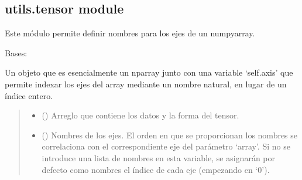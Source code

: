 \documentclass[letterpaper,10pt,english]{sphinxmanual}
\begin{document}
\sphinxstepscope


\subsection{utils.tensor module}
\label{\detokenize{utils.tensor:module-utils.tensor}}\label{\detokenize{utils.tensor:utils-tensor-module}}\label{\detokenize{utils.tensor::doc}}
\sphinxAtStartPar
Este módulo permite definir nombres para los ejes
de un numpyarray.

\begin{fulllineitems}
\label{\detokenize{utils.tensor:utils.tensor.Tensor}}
\pysigstartsignatures
{}
\pysigstopsignatures
\sphinxAtStartPar
Bases: 

\sphinxAtStartPar
Un objeto que es esencialmente un nparray junto con una variable ‘self.axis’ que permite indexar los ejes del array mediante un nombre natural, en lugar de un índice entero.
\begin{quote}\begin{description}
\begin{itemize}
\item {} 
\sphinxAtStartPar
{} () \textendash{} Arreglo que contiene los datos y la forma del tensor.

\item {} 
\sphinxAtStartPar
{} (\sphinxstyleliteralemphasis{\sphinxupquote{, }}) \textendash{} Nombres de los ejes. El orden en que se proporcionan los nombres se correlaciona
con el correspondiente eje del parámetro ‘array’. Si no se introduce una lista de nombres en esta variable,
se asignarán por defecto como nombres el índice de cada eje (empezando en ‘0’).


\end{itemize}
\end{description}
\end{quote}
\end{fulllineitems}
\end{document}
